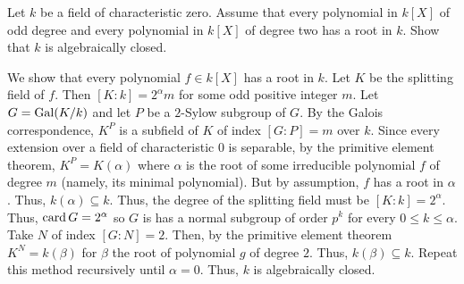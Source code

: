 \begin{problem}
  Let \(k\) be a field of characteristic zero. Assume that every polynomial
  in \(k[X]\) of odd degree and every polynomial in \(k[X]\) of degree two
  has a root in \(k\). Show that \(k\) is algebraically closed.
\end{problem}
\begin{solution}
  We show that every polynomial \(f\in k[X]\) has a root in \(k\). Let
  \(K\) be the splitting field of \(f\). Then \([K:k]=2^\alpha m\) for some
  odd positive integer \(m\). Let \(G=\operatorname{Gal}(K/k)\) and let \(P\) be a
  \(2\)-Sylow subgroup of \(G\). By the Galois correspondence, \(K^P\) is a
  subfield of \(K\) of index \([G:P]=m\) over \(k\). Since every extension
  over a field of characteristic \(0\) is separable, by the primitive
  element theorem, \(K^P=K(\alpha)\) where \(\alpha\) is the root of some
  irreducible polynomial \(f\) of degree \(m\) (namely, its minimal
  polynomial). But by assumption, \(f\) has a root in \(\alpha\). Thus,
  \(k(\alpha)\subseteq k\). Thus, the degree of the splitting field must be
  \([K:k]=2^\alpha\). Thus, \(\operatorname{card} G=2^\alpha\) so \(G\) is has a normal
  subgroup of order \(p^k\) for every \(0\leq k\leq\alpha\). Take \(N\) of
  index \([G:N]=2\). Then, by the primitive element theorem
  \(K^N=k(\beta)\) for \(\beta\) the root of polynomial \(g\) of degree
  \(2\). Thus, \(k(\beta)\subseteq k\). Repeat this method recursively
  until \(\alpha=0\). Thus, \(k\) is algebraically closed.
\end{solution}

